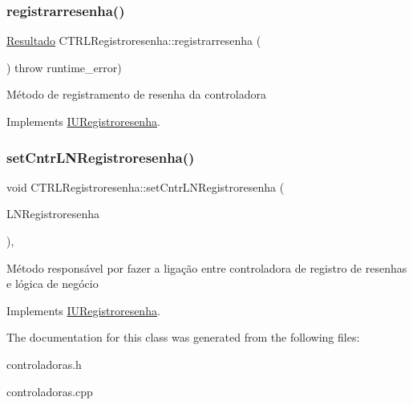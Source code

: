 \subsubsection{\texorpdfstring{registrarresenha()}{registrarresenha()}}
{\footnotesize\ttfamily \hyperlink{classResultado}{Resultado} C\+T\+R\+L\+Registroresenha\+::registrarresenha (\begin{DoxyParamCaption}{ }\end{DoxyParamCaption}) throw  runtime\+\_\+error) \hspace{0.3cm}{\ttfamily [virtual]}}

Método de registramento de resenha da controladora 

Implements \hyperlink{classIURegistroresenha}{I\+U\+Registroresenha}.

\mbox{\label{classCTRLRegistroresenha_a89128992373f3a1e857e49294e820dc3}} 
\subsubsection{\texorpdfstring{set\+Cntr\+L\+N\+Registroresenha()}{setCntrLNRegistroresenha()}}
{\footnotesize\ttfamily void C\+T\+R\+L\+Registroresenha\+::set\+Cntr\+L\+N\+Registroresenha (\begin{DoxyParamCaption}\item[{\hyperlink{classILNRegistroresenha}{I\+L\+N\+Registroresenha} $\ast$}]{L\+N\+Registroresenha }\end{DoxyParamCaption})\hspace{0.3cm}{\ttfamily [inline]}, {\ttfamily [virtual]}}

Método responsável por fazer a ligação entre controladora de registro de resenhas e lógica de negócio 

Implements \hyperlink{classIURegistroresenha}{I\+U\+Registroresenha}.



The documentation for this class was generated from the following files\+:\begin{DoxyCompactItemize}
\item 
controladoras.\+h\item 
controladoras.\+cpp\end{DoxyCompactItemize}

